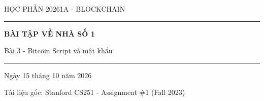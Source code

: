 \documentclass[12pt,a4paper]{article}
\begin{document}
\hypersetup{pageanchor=false}
\begin{titlepage}
  \centering
  {\large\sffamily HỌC PHẦN 20261A - BLOCKCHAIN\par}
  \vspace{1.8cm}
  {\color{navy}\rule{0.88\textwidth}{1.2pt}\par}
  \vspace{0.65cm}
  {\Huge\bfseries BÀI TẬP VỀ NHÀ SỐ 1\par}
  \vspace{0.35cm}
  {\Large Bài 3 - Bitcoin Script và mật khẩu\par}
  \vspace{0.65cm}
  {\color{navy}\rule{0.88\textwidth}{1.2pt}\par}

  \vfill
  {\large Ngày 15 tháng 10 năm 2026\par}
  \vspace{0.8cm}
  {\small Tài liệu gốc: Stanford CS251 - Assignment \#1 (Fall 2023)\par}
\end{titlepage}

\hypersetup{pageanchor=true}


\end{document}
